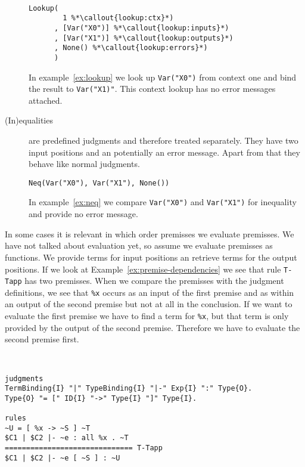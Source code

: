 \begin{description}
\begin{example}{~}
\begin{lstlisting}[language=sltc]
Lookup(
        1 %*\callout{lookup:ctx}*)
      , [Var("X0")] %*\callout{lookup:inputs}*)
      , [Var("X1")] %*\callout{lookup:outputs}*)
      , None() %*\callout{lookup:errors}*)
      )
\end{lstlisting}
\label{ex:lookup}
\end{example}

  In example~\ref{ex:lookup} we look up \verb|Var("X0")| from
  context one and bind the result to \verb|Var("X1)"|. This context
  lookup has no error messages attached.

\item[(In)equalities] are predefined judgments and therefore treated
  separately. They have two input positions and an potentially an
  error message. Apart from that they behave like normal judgments.

\begin{example}
\begin{lstlisting}[language=sltc]
Neq(Var("X0"), Var("X1"), None())
\end{lstlisting}
\label{ex:neq}
\end{example}

  In example~\ref{ex:neq} we compare \verb|Var("X0")| and
  \verb|Var("X1")| for inequality and provide no error message.
\end{description}

In some cases it is relevant in which order premisses we evaluate
premisses. We have not talked about evaluation yet, so assume we
evaluate premisses as functions. We provide terms for input positions
an retrieve terms for the output positions. If we look at
Example~\ref{ex:premise-dependencies} we see that rule \verb|T-Tapp|
has two premisses. When we compare the premisses with the judgment
definitions, we see that \verb|%x| occurs as an input of the first
premise and as within an output of the second premise but not at all
in the conclusion. If we want to evaluate the first premise we
have to find a term for \verb|%x|, but that term is only provided by
the output of the second premise. Therefore we have to evaluate the
second premise first.

\begin{example}{~}
\begin{lstlisting}[language=sltc]
judgments
TermBinding{I} "|" TypeBinding{I} "|-" Exp{I} ":" Type{O}.
Type{O} "= [" ID{I} "->" Type{I} "]" Type{I}.

rules
~U = [ %x -> ~S ] ~T
$C1 | $C2 |- ~e : all %x . ~T 
============================== T-Tapp
$C1 | $C2 |- ~e [ ~S ] : ~U
\end{lstlisting}
\label{ex:premise-dependencies}
\end{example}

